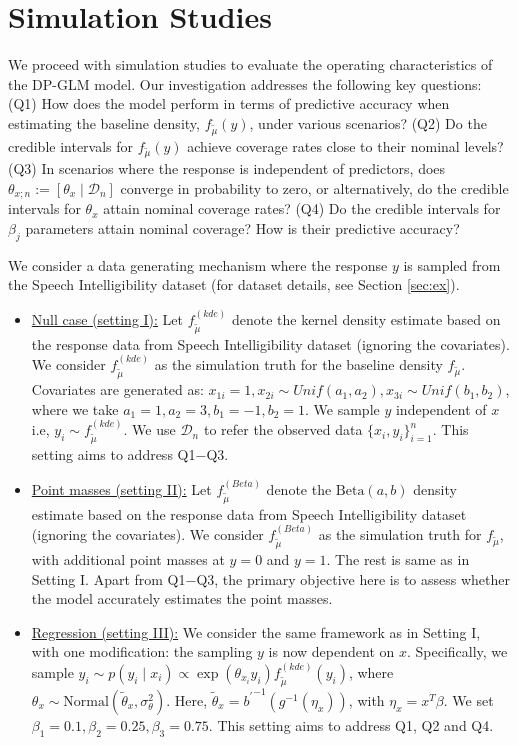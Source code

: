\documentclass{article}[12pt]
\newcommand{\refa}[1]{\textcolor{blue}{\ref{#1}}} %
\newcommand{\tmu}{\widetilde{\mu}}
\begin{document}
\section{Simulation Studies}
\label{sec:sim}
We proceed with simulation studies to evaluate the operating characteristics of the DP-GLM model. Our investigation addresses the following key questions: \newline (Q1) How does the model perform in terms of predictive accuracy when estimating the baseline density, $f_{\tmu}(y)$, under various scenarios? \newline (Q2) Do the credible intervals for $f_{\tmu}(y)$ achieve coverage rates close to their nominal levels? \newline (Q3) In scenarios where the response is independent of predictors, does $\theta_{x; n} := [\theta_x \mid \mathcal{D}_n]$ converge in probability to zero, or alternatively, do the credible intervals for $\theta_x$ attain nominal coverage rates? \newline  (Q4) Do the credible intervals for $\beta_j$ parameters attain nominal coverage? How is their predictive accuracy?

We consider a data generating mechanism where the response $y$ is sampled from the Speech Intelligibility dataset (for dataset details, see Section \refa{sec:ex}).
\begin{itemize}
    \item \underline{Null case (setting I):} Let $f^{(kde)}_{\tmu}$ denote the kernel density estimate based on the response data from Speech Intelligibility dataset (ignoring the covariates). We consider $f^{(kde)}_{\tmu}$ as the simulation truth for the baseline density $f_{\tmu}$. Covariates are generated as: $x_{1i} = 1, x_{2i} \sim Unif(a_1, a_2), x_{3i} \sim Unif(b_1, b_2)$, where we take $a_1 = 1, a_2 = 3, b_1 = -1, b_2 = 1$. We sample $y$ independent of $x$ i.e, $y_i \sim f^{(kde)}_{\tmu}$. We use $\mathcal{D}_n$ to refer the observed data $\{x_i, y_i\}_{i=1}^n$. This setting aims to address Q1$-$Q3.    

    \item \underline{Point masses (setting II):} Let $f^{(Beta)}_{\tmu}$ denote the $\text{Beta}(a,b)$ density estimate based on the response data from Speech Intelligibility dataset (ignoring the covariates). We consider $f^{(Beta)}_{\tmu}$ as the simulation truth for $f_{\tmu}$, with additional point masses at $y = 0$ and $y = 1$. The rest is same as in Setting I. Apart from Q1$-$Q3, the primary objective here is to assess whether the model accurately estimates the point masses. 

    \item \underline{Regression (setting III):} We consider the same framework as in Setting I, with one modification: the sampling $y$ is now dependent on $x$. Specifically, we sample $y_i \sim p(y_i \mid x_i) \propto \exp(\theta_{x_i} y_i)f^{(kde)}_{\tmu}(y_i)$, where $\theta_x \sim \text{Normal}(\widetilde \theta_x, \sigma^2_\theta)$. Here, $\widetilde \theta_x = {b^\prime}^{-1}(g^{-1}(\eta_x))$, with $\eta_x = x^T\beta$. We set $\beta_1 = 0.1, \beta_2 = 0.25, \beta_3 = 0.75$. This setting aims to address Q1, Q2 and Q4.
\end{itemize}
 
\end{document}
